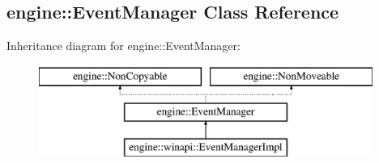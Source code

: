 \hypertarget{a00034}{}\subsection{engine\+:\+:Event\+Manager Class Reference}
\label{a00034}
Inheritance diagram for engine\+:\+:Event\+Manager\+:\begin{figure}[H]
\begin{center}
\leavevmode
\includegraphics[height=3.000000cm]{a00034}
\end{center}
\end{figure}
